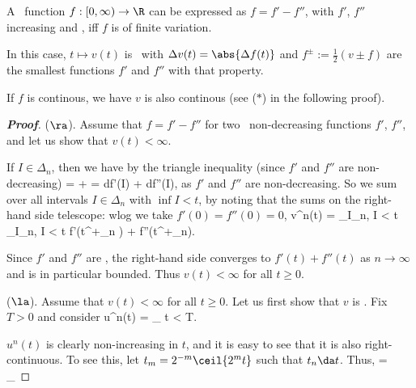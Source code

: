 \begin{proposition}\label{pro:cadlag_function_two_increasing_function}
A \cadlag\ function $f: [0,\infty) \to  \R$ can be expressed as $f = f' - f''$, with $f'$, $f''$ increasing and \cadlag, iff $f$ is of finite variation. 

In this case, $t \mapsto v(t)$ is \cadlag\ with $\Delta v(t) = \abs{\Delta f(t)}$ and $f^\pm := \frac 12 (v \pm f)$ are the smallest functions $f'$ and $f''$ with that property.
\end{proposition}

\begin{remark}
If $f$ is continous, we have $v$ is also continous (see ($*$) in the following proof).
\end{remark}

\begin{proof}[\bf Proof]%
($\ra$). Assume that $f = f' -f''$ for two \cadlag\ non-decreasing functions $f'$, $f''$, and let us show that $v(t) < \infty$.

If $I \in \Delta_n$, then we have by the triangle inequality (since $f'$ and $f''$ are non-decreasing) 
\be
{} =  \leq {} +  =  df'(I) + df''(I),
\ee
as $f'$ and $f''$ are non-decreasing. So we sum over all intervals $I \in \Delta_n$ with $\inf I < t$, by noting that the sums on the right-hand side telescope: wlog we take $f'(0) = f''(0) = 0$,
\be
v^n(t) = \sum_{I\in \Delta_n, \inf I < t}  \leq \sum_{I\in \Delta_n, \inf I < t}  \leq f'(t^+_n ) + f''(t^+_n).
\ee

Since $f'$ and $f''$ are \cadlag, the right-hand side converges to $f'(t) + f''(t)$ as $n \to \infty$ and is in particular bounded. Thus $v(t) < \infty$ for all $t \geq 0$.

($\la$). Assume that $v(t) < \infty$ for all $t \geq 0$. Let us first show that $v$ is \cadlag. Fix $T > 0$ and consider
\be
u^n(t) = \sum_{}  \quad{}t < T.
\ee

$u^n(t)$ is clearly non-increasing in $t$, and it is easy to see that it is also right-continuous. To see this, let $t_m = 2^{-m}\ceil{2^m t}$ such that $t_n \da t$. Thus,%
\be
{} = \sum_{}  %
\ee


\end{proof}
